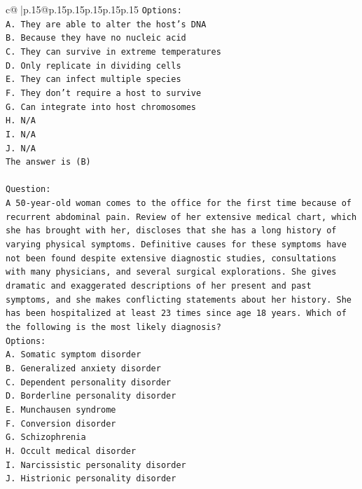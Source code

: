 \documentclass{article}
\begin{document}
{\begin{supertabular}{c@{$\;$}|p{.15\linewidth}@{}p{.15\linewidth}p{.15\linewidth}p{.15\linewidth}p{.15\linewidth}p{.15\linewidth}}
{{{\texttt{Options:} \\
\texttt{A. They are able to alter the host's DNA} \\
\texttt{B. Because they have no nucleic acid} \\
\texttt{C. They can survive in extreme temperatures} \\
\texttt{D. Only replicate in dividing cells} \\
\texttt{E. They can infect multiple species} \\
\texttt{F. They don't require a host to survive} \\
\texttt{G. Can integrate into host chromosomes} \\
\texttt{H. N/A} \\
\texttt{I. N/A} \\
\texttt{J. N/A} \\
\texttt{The answer is (B)} \\
\\ 
\texttt{Question:} \\
\texttt{A 50{-}year{-}old woman comes to the office for the first time because of recurrent abdominal pain. Review of her extensive medical chart, which she has brought with her, discloses that she has a long history of varying physical symptoms. Definitive causes for these symptoms have not been found despite extensive diagnostic studies, consultations with many physicians, and several surgical explorations. She gives dramatic and exaggerated descriptions of her present and past symptoms, and she makes conflicting statements about her history. She has been hospitalized at least 23 times since age 18 years. Which of the following is the most likely diagnosis?} \\
\texttt{Options:} \\
\texttt{A. Somatic symptom disorder} \\
\texttt{B. Generalized anxiety disorder} \\
\texttt{C. Dependent personality disorder} \\
\texttt{D. Borderline personality disorder} \\
\texttt{E. Munchausen syndrome} \\
\texttt{F. Conversion disorder} \\
\texttt{G. Schizophrenia} \\
\texttt{H. Occult medical disorder} \\
\texttt{I. Narcissistic personality disorder} \\
\texttt{J. Histrionic personality disorder} \\
            }
        }
    }
     \\ \\


\end{supertabular}}
\end{document}
